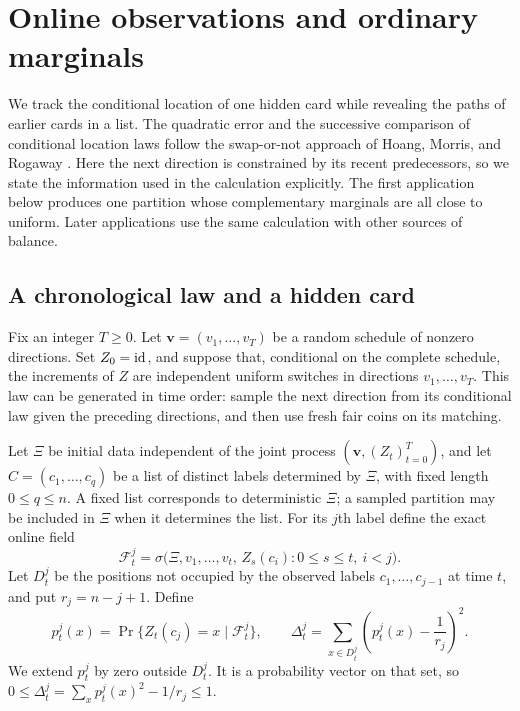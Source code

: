 \section{Online observations and ordinary marginals}
\label{sec:marginals}

We track the conditional location of one hidden card while revealing
the paths of earlier cards in a list. The quadratic error and the
successive comparison of conditional location laws follow the
swap-or-not approach of Hoang, Morris, and Rogaway
\cite[Section~3, Theorem~3 and Lemma~4]{hmr2014}. Here the next
direction is constrained by its recent predecessors, so we state
the information used in the calculation explicitly. The first
application below produces one partition whose complementary
marginals are all close to uniform. Later applications use the same
calculation with other sources of balance.

\subsection{A chronological law and a hidden card}

Fix an integer $T\ge0$. Let $\mathbf v=(v_1,\ldots,v_T)$ be a random schedule of nonzero
directions. Set $Z_0=\mathrm{id}$, and suppose that, conditional on the
complete schedule, the increments of $Z$ are independent uniform
switches in directions $v_1,\ldots,v_T$. This law can be generated
in time order: sample the next direction from its conditional law
given the preceding directions, and then use fresh fair coins on
its matching.

Let $\Xi$ be initial data independent of the joint process
$(\mathbf v,(Z_t)_{t=0}^T)$, and let
$C=(c_1,\ldots,c_q)$ be a list of distinct labels determined by
$\Xi$, with fixed length $0\le q\le n$. A fixed list corresponds to
deterministic $\Xi$; a sampled partition may be included in $\Xi$
when it determines the list. For its $j$th label define the exact
online field
\begin{equation}\label{eq:marginal-filtration}
 \mathcal F_t^{j}
 =\sigma\bigl(\Xi,v_1,\ldots,v_t,\,
        Z_s(c_i):0\le s\le t,\ i<j\bigr).
\end{equation}
Let $D_t^j$ be the positions not occupied by the observed labels
$c_1,\ldots,c_{j-1}$ at time $t$, and put $r_j=n-j+1$. Define
\begin{equation}\label{eq:marginal-energy}
 p_t^j(x)=\Pr\{Z_t(c_j)=x\mid\mathcal F_t^j\},\qquad
 \Delta_t^j=\sum_{x\in D_t^j}\left(p_t^j(x)-\frac1{r_j}\right)^2.
\end{equation}
We extend $p_t^j$ by zero outside $D_t^j$. It is a probability
vector on that set, so
$0\le\Delta_t^j=\sum_xp_t^j(x)^2-1/r_j\le1$.

